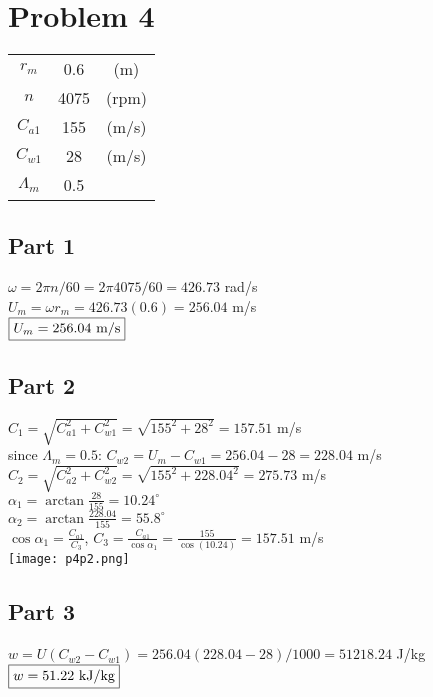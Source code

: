 \documentclass{article}
\begin{document}
\section*{Problem 4}
\begin{tabular}{ccc}
    $r_m$ & 0.6 & (m) \\
    $n$ & 4075 & (rpm) \\
    $C_{a1}$ & 155 & (m/s) \\
    $C_{w1}$ & 28 & (m/s) \\
    $\Lambda_m$ & 0.5 \\
\end{tabular}

\subsection*{Part 1}
$\omega=2\pi n/60=2\pi 4075/60=426.73$ rad/s \\
$U_m=\omega r_m=426.73(0.6)=256.04$ m/s \\
$\fbox{$U_m=256.04$ m/s}$

\subsection*{Part 2}
$C_1=\sqrt{C_{a1}^2+C_{w1}^2}=\sqrt{155^2+28^2}=157.51$ m/s \\
since $\Lambda_m=0.5$: $C_{w2}=U_m-C_{w1}=256.04-28=228.04$ m/s \\
$C_2=\sqrt{C_{a2}^2+C_{w2}^2}=\sqrt{155^2+228.04^2}=275.73$ m/s \\
$\alpha_1=\arctan\frac{28}{155}=10.24^\circ$ \\
$\alpha_2=\arctan\frac{228.04}{155}=55.8^\circ$ \\
$\cos\alpha_1=\frac{C_{a1}}{C_3}$, \quad $C_3=\frac{C_{a1}}{\cos\alpha_1}=\frac{155}
{\cos(10.24)}=157.51$ m/s \\
\texttt{[image: p4p2.png]}

\subsection*{Part 3}
$w=U(C_{w2}-C_{w1})=256.04(228.04-28)/1000=51218.24$ J/kg \\
$\fbox{$w=51.22$ kJ/kg}$
\end{document}
